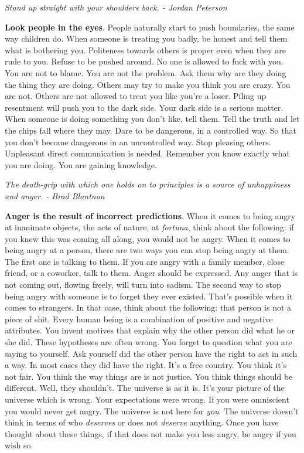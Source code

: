 \documentclass[a4paper,hidelinks]{article}
\begin{document}
\newpage

\begin{center}
\textit{Stand up straight with your shoulders back. - Jordan Peterson}
\end{center}

\textbf{Look people in the eyes}.
People naturally start to push boundaries, the same way children do.
When someone is treating you badly, be honest and tell them what is bothering you.
Politeness towards others is proper even when they are rude to you.
Refuse to be pushed around.
No one is allowed to fuck with you.
You are not to blame.
You are not the problem.
Ask them why are they doing the thing they are doing.
Others may try to make you think you are crazy.
You are not.
Others are not allowed to treat you like you're a loser.
Piling up resentment will push you to the dark side.
Your dark side is a serious matter.
When someone is doing something you don't like, tell them.
Tell the truth and let the chips fall where they may.
Dare to be dangerous, in a controlled way.
So that you don't become dangerous in an uncontrolled way.
Stop pleasing others.
Unpleasant direct communication is needed.
Remember you know exactly what you are doing.
You are gaining knowledge.

\newpage

\begin{center}
\textit{The death-grip with which one holds on to principles is a source of unhappiness and anger. - Brad Blantnon}
\end{center}

\textbf{Anger is the result of incorrect predictions}.
When it comes to being angry at inanimate objects, the acts of nature, at \textit{fortuna}, think about the following: if you knew this was coming all along, you would not be angry.
When it comes to being angry at a person, there are two ways you can stop being angry at them.
The first one is talking to them.
If you are angry with a family member, close friend, or a coworker, talk to them.
Anger should be expressed.
Any anger that is not coming out, flowing freely, will turn into sadism.
The second way to stop being angry with someone is to forget they ever existed.
That's possible when it comes to strangers.
In that case, think about the following: that person is not a piece of shit.
Every human being is a combination of positive and negative attributes.
You invent motives that explain why the other person did what he or she did.
These hypotheses are often wrong.
You forget to question what you are saying to yourself.
Ask yourself did the other person have the right to act in such a way.
In most cases they did have the right.
It's a free country.
You think it's not fair.
You think the way things are is not justice.
You think things should be different.
Well, they shouldn't.
The universe is as it is.
It's your picture of the universe which is wrong.
Your expectations were wrong.
If you were omniscient you would never get angry.
The universe is not here for \textit{you}.
The universe doesn't think in terms of who \textit{deserves} or does not \textit{deserve} anything.
Once you have thought about these things, if that does not make you less angry, be angry if you wish so.
\end{document}
